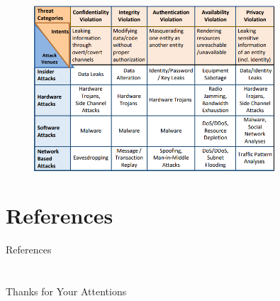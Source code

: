 \documentclass{beamer}
\begin{document}
\begin{frame}{}
    \begin{figure}[t]
        \centering
        \includegraphics[width=0.8\textwidth]{figures/threat_model.png}
        
    \end{figure}
\end{frame}
\section{References}
\calcreferencespagetotal %
\begin{frame}[allowframebreaks]{References}
    \fontsize{9pt}{13}\selectfont
    
    
\end{frame}

\section{}

\begin{frame}
    \centering
    \Large{Thanks for Your Attentions}
\end{frame}
\end{document}
